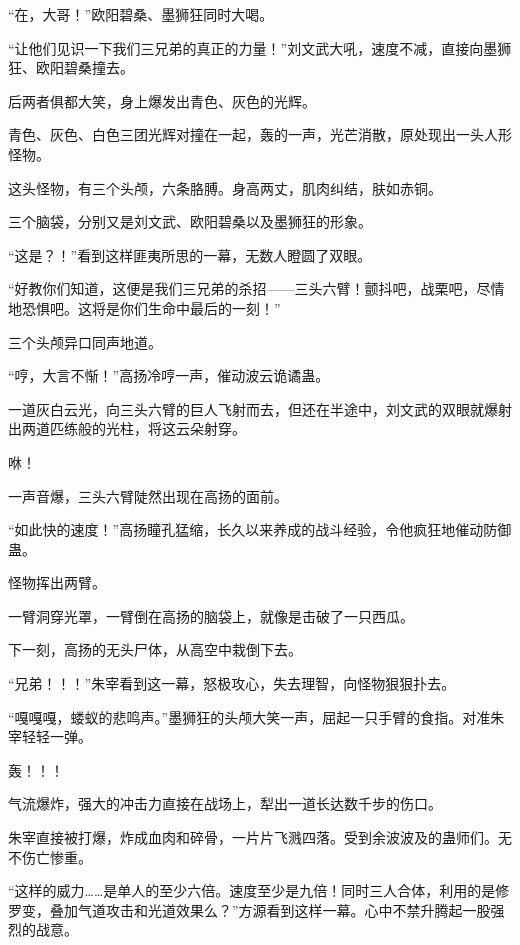 
\begin{this_body}

“在，大哥！”欧阳碧桑、墨狮狂同时大喝。

“让他们见识一下我们三兄弟的真正的力量！”刘文武大吼，速度不减，直接向墨狮狂、欧阳碧桑撞去。

后两者俱都大笑，身上爆发出青色、灰色的光辉。

青色、灰色、白色三团光辉对撞在一起，轰的一声，光芒消散，原处现出一头人形怪物。

这头怪物，有三个头颅，六条胳膊。身高两丈，肌肉纠结，肤如赤铜。

三个脑袋，分别又是刘文武、欧阳碧桑以及墨狮狂的形象。

“这是？！”看到这样匪夷所思的一幕，无数人瞪圆了双眼。

“好教你们知道，这便是我们三兄弟的杀招——三头六臂！颤抖吧，战栗吧，尽情地恐惧吧。这将是你们生命中最后的一刻！”

三个头颅异口同声地道。

“哼，大言不惭！”高扬冷哼一声，催动波云诡谲蛊。

一道灰白云光，向三头六臂的巨人飞射而去，但还在半途中，刘文武的双眼就爆射出两道匹练般的光柱，将这云朵射穿。

咻！

一声音爆，三头六臂陡然出现在高扬的面前。

“如此快的速度！”高扬瞳孔猛缩，长久以来养成的战斗经验，令他疯狂地催动防御蛊。

怪物挥出两臂。

一臂洞穿光罩，一臂倒在高扬的脑袋上，就像是击破了一只西瓜。

下一刻，高扬的无头尸体，从高空中栽倒下去。

“兄弟！！！”朱宰看到这一幕，怒极攻心，失去理智，向怪物狠狠扑去。

“嘎嘎嘎，蝼蚁的悲鸣声。”墨狮狂的头颅大笑一声，屈起一只手臂的食指。对准朱宰轻轻一弹。

轰！！！

气流爆炸，强大的冲击力直接在战场上，犁出一道长达数千步的伤口。

朱宰直接被打爆，炸成血肉和碎骨，一片片飞溅四落。受到余波波及的蛊师们。无不伤亡惨重。

“这样的威力……是单人的至少六倍。速度至少是九倍！同时三人合体，利用的是修罗变，叠加气道攻击和光道效果么？”方源看到这样一幕。心中不禁升腾起一股强烈的战意。


\end{this_body}
